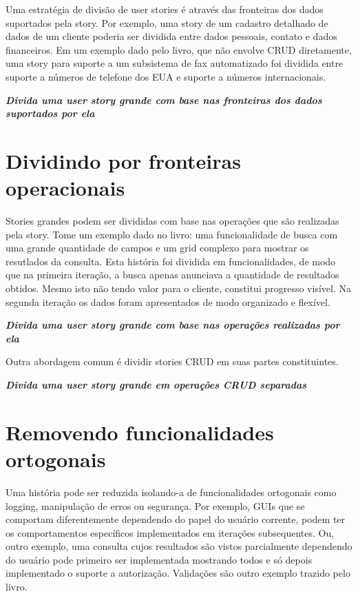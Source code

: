 \documentclass[a4paper,abntfigtabnum,noindentfirst]{abnt}
\begin{document}
Uma estratégia de divisão de user stories é através das fronteiras dos dados suportados pela story. Por exemplo, uma story de um cadastro detalhado de dados de um cliente poderia ser dividida entre dados pessoais, contato e dados financeiros. Em um exemplo dado pelo livro, que não envolve CRUD diretamente, uma story para suporte a um subsistema de fax automatizado foi dividida entre suporte a números de telefone dos EUA e suporte a números internacionais.

\textit{\textbf{Divida uma user story grande com base nas fronteiras dos dados suportados por ela}}


\section{Dividindo por fronteiras operacionais}

Stories grandes podem ser divididas com base nas operações que são realizadas pela story. Tome um exemplo dado no livro: uma funcionalidade de busca com uma grande quantidade de campos e um grid complexo para mostrar os resutlados da consulta. Esta história foi dividida em funcionalidades, de modo que na primeira iteração, a busca apenas anunciava a quantidade de resultados obtidos. Mesmo isto não tendo valor para o cliente, constitui progresso visível. Na segunda iteração os dados foram apresentados de modo organizado e flexível.

\textit{\textbf{Divida uma user story grande com base nas operações realizadas por ela}}

Outra abordagem comum é dividir stories CRUD em suas partes constituintes.

\textit{\textbf{Divida uma user story grande em operações CRUD separadas}}


\section{Removendo funcionalidades ortogonais}

Uma história pode ser reduzida isolando-a de funcionalidades ortogonais como logging, manipulação de erros ou segurança. Por exemplo, GUIs que se comportam diferentemente dependendo do papel do usuário corrente, podem ter os comportamentos específicos implementados em iterações subsequentes. Ou, outro exemplo, uma consulta cujos resultados são vistos parcialmente dependendo do usuário pode primeiro ser implementada mostrando todos e só depois implementado o suporte a autorização. Validações são outro exemplo trazido pelo livro.
\end{document}
